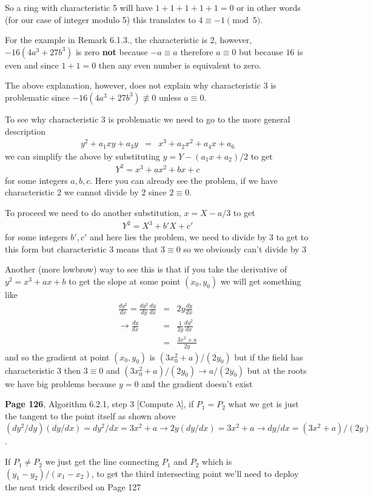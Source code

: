 \documentclass[aps,preprint,preprintnumbers,nofootinbib,showpacs,prd]{revtex4-1}
\newcommand{\nbea}{\begin{eqnarray*}}
\newcommand{\neea}{\end{eqnarray*}}
\begin{document}
So a ring with characteristic 5 will have $1 + 1 + 1 + 1 + 1 = 0$ or in other words (for our case of integer modulo 5) this translates to $4 \equiv -1 \pmod{5}$.

For the example in Remark 6.1.3., the characteristic is 2, however, $-16(4a^3 + 27b^3)$ is zero {\bf not} because $-a \equiv a$ therefore $a \equiv 0$ but because $16$ is even and since $1 + 1 = 0$ then any even number is equivalent to zero.

The above explanation, however, does not explain why characteristic 3 is problematic since $-16(4a^3 + 27b^3) \not\equiv 0$ unless $a \equiv 0$.

To see why characteristic 3 is problematic we need to go to the more general description
%
\nbea
y^2 + a_1xy + a_3y & = & x^3 + a_2x^2 + a_4x + a_6
\neea
%
we can simplify the above by substituting $y = Y -(a_1x + a_2)/2$ to get
%
\nbea
Y^2 = x^3 + ax^2 + bx + c
\neea
%
for some integers $a,b,c$. Here you can already see the problem, if we have characteristic 2 we cannot divide by 2 since $2 \equiv 0$.

To proceed we need to do another substitution, $x = X - a/3$ to get
%
\nbea
Y^2 = X^3 + b'X + c'
\neea
%
for some integers $b',c'$ and here lies the problem, we need to divide by 3 to get to this form but characteristic 3 means that $3 \equiv 0$ so we obviously can't divide by 3

Another (more lowbrow) way to see this is that if you take the derivative of $y^2 = x^3 + ax + b$ to get the slope at some point $(x_0,y_0)$ we will get something like
%
\nbea
\frac{dy^2}{dx} = \frac{dy^2}{dy}\frac{dy}{dx} & = & 2y\frac{dy}{dx} \\
\to \frac{dy}{dx} & = & \frac{1}{2y} \frac{dy^2}{dx} \\
& = & \frac{3x^2 + a}{2y}
\neea
%
and so the gradient at point $(x_0,y_0)$ is $(3x_0^2 + a)/(2y_0)$ but if the field has characteristic 3 then $3 \equiv 0$ and $(3x_0^2 + a)/(2y_0) \to a/(2y_0)$ but at the roots we have big problems because $y = 0$ and the gradient doesn't exist

{\bf Page 126}, Algorithm 6.2.1, step 3 [Compute $\lambda$], if $P_1 = P_2$ what we get is just the tangent to the point itself as shown above $(dy^2/dy)(dy/dx) = dy^2/dx = 3x^2 + a \to 2y(dy/dx) = 3x^2 + a \to dy/dx = (3x^2 + a)/(2y)$.

If $P_1 \neq P_2$ we just get the line connecting $P_1$ and $P_2$ which is $(y_1-y_2)/(x_1-x_2)$, to get the third intersecting point we'll need to deploy the neat trick described on Page 127
\end{document}
